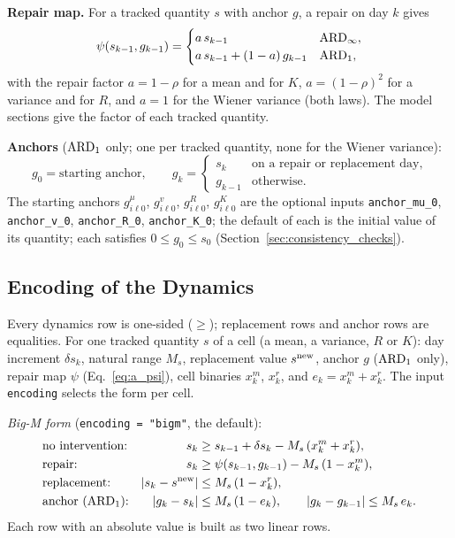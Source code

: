 \textbf{Repair map.} For a tracked quantity $s$ with anchor $g$, a repair on day $k$
gives
\begin{equation}
  \psi(s_{k-1}, g_{k-1}) =
  \begin{cases}
    a\, s_{k-1} & \mathrm{ARD}_{\infty}, \\
    a\, s_{k-1} + (1-a)\, g_{k-1} & \mathrm{ARD}_{1},
  \end{cases}
  \label{eq:a_psi}
\end{equation}
with the repair factor $a = 1 - \rho$ for a mean and for $K$, $a = (1-\rho)^2$ for a
variance and for $R$, and $a = 1$ for the Wiener variance (both laws). The model
sections give the factor of each tracked quantity.

\textbf{Anchors} ($\mathrm{ARD}_{1}$ only; one per tracked quantity, none for the Wiener
variance):
\begin{equation}
  g_0 = \text{starting anchor}, \qquad
  g_k = \begin{cases}
    s_k & \text{on a repair or replacement day}, \\
    g_{k-1} & \text{otherwise}.
  \end{cases}
  \label{eq:a_anchor}
\end{equation}
The starting anchors $g^{\mu}_{i\ell 0}$, $g^{v}_{i\ell 0}$, $g^{R}_{i\ell 0}$,
$g^{K}_{i\ell 0}$ are the optional inputs \texttt{anchor\_mu\_0}, \texttt{anchor\_v\_0},
\texttt{anchor\_R\_0}, \texttt{anchor\_K\_0}; the default of each is the initial value
of its quantity; each satisfies $0 \leq g_0 \leq s_0$
(Section~\ref{sec:consistency_checks}).

\subsection{Encoding of the Dynamics}
\label{sec:encoding}

Every dynamics row is one-sided ($\geq$); replacement rows and anchor rows are
equalities. For one tracked quantity $s$ of a cell (a mean, a variance, $R$ or $K$):
day increment $\delta s_k$, natural range $M_s$, replacement value $s^{\mathrm{new}}$, anchor
$g$ ($\mathrm{ARD}_{1}$ only), repair map $\psi$ (Eq.~\eqref{eq:a_psi}), cell binaries $x^m_k$,
$x^r_k$, and $e_k = x^m_k + x^r_k$. The input \texttt{encoding} selects the form per
cell.

\emph{Big-M form} (\texttt{encoding = "bigm"}, the default):
\begin{align}
  &\text{no intervention:} & s_k &\geq s_{k-1} + \delta s_k - M_s\,(x^m_k + x^r_k),
    \label{eq:a_bigm_carry} \\
  &\text{repair:} & s_k &\geq \psi(s_{k-1}, g_{k-1}) - M_s\,(1 - x^m_k),
    \label{eq:a_bigm_repair} \\
  &\text{replacement:} & |s_k - s^{\mathrm{new}}| &\leq M_s\,(1 - x^r_k),
    \label{eq:a_bigm_repl} \\
  &\text{anchor } (\mathrm{ARD}_{1})\text{:} & |g_k - s_k| &\leq M_s\,(1 - e_k), \qquad
    |g_k - g_{k-1}| \leq M_s\, e_k .
    \label{eq:a_bigm_anchor}
\end{align}
Each row with an absolute value is built as two linear rows.

